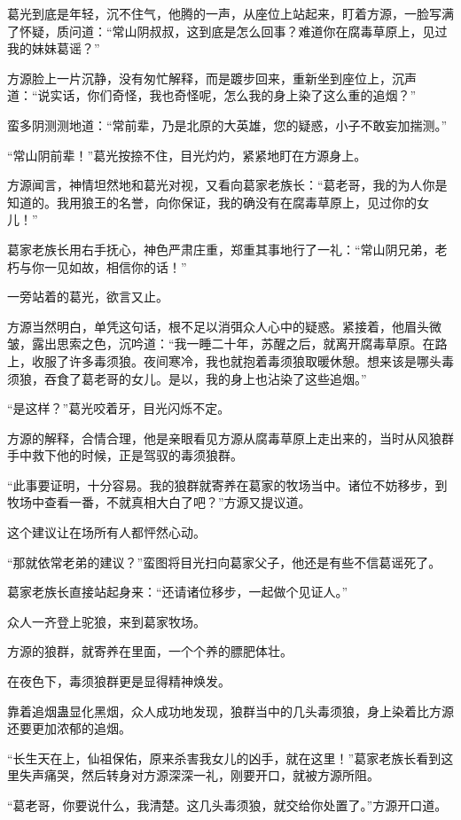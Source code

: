 \begin{this_body}
葛光到底是年轻，沉不住气，他腾的一声，从座位上站起来，盯着方源，一脸写满了怀疑，质问道：“常山阴叔叔，这到底是怎么回事？难道你在腐毒草原上，见过我的妹妹葛谣？”

方源脸上一片沉静，没有匆忙解释，而是踱步回来，重新坐到座位上，沉声道：“说实话，你们奇怪，我也奇怪呢，怎么我的身上染了这么重的追烟？”

蛮多阴测测地道：“常前辈，乃是北原的大英雄，您的疑惑，小子不敢妄加揣测。”

“常山阴前辈！”葛光按捺不住，目光灼灼，紧紧地盯在方源身上。

方源闻言，神情坦然地和葛光对视，又看向葛家老族长：“葛老哥，我的为人你是知道的。我用狼王的名誉，向你保证，我的确没有在腐毒草原上，见过你的女儿！”

葛家老族长用右手抚心，神色严肃庄重，郑重其事地行了一礼：“常山阴兄弟，老朽与你一见如故，相信你的话！”

一旁站着的葛光，欲言又止。

方源当然明白，单凭这句话，根不足以消弭众人心中的疑惑。紧接着，他眉头微皱，露出思索之色，沉吟道：“我一睡二十年，苏醒之后，就离开腐毒草原。在路上，收服了许多毒须狼。夜间寒冷，我也就抱着毒须狼取暖休憩。想来该是哪头毒须狼，吞食了葛老哥的女儿。是以，我的身上也沾染了这些追烟。”

“是这样？”葛光咬着牙，目光闪烁不定。

方源的解释，合情合理，他是亲眼看见方源从腐毒草原上走出来的，当时从风狼群手中救下他的时候，正是驾驭的毒须狼群。

“此事要证明，十分容易。我的狼群就寄养在葛家的牧场当中。诸位不妨移步，到牧场中查看一番，不就真相大白了吧？”方源又提议道。

这个建议让在场所有人都怦然心动。

“那就依常老弟的建议？”蛮图将目光扫向葛家父子，他还是有些不信葛谣死了。

葛家老族长直接站起身来：“还请诸位移步，一起做个见证人。”

众人一齐登上驼狼，来到葛家牧场。

方源的狼群，就寄养在里面，一个个养的膘肥体壮。

在夜色下，毒须狼群更是显得精神焕发。

靠着追烟蛊显化黑烟，众人成功地发现，狼群当中的几头毒须狼，身上染着比方源还要更加浓郁的追烟。

“长生天在上，仙祖保佑，原来杀害我女儿的凶手，就在这里！”葛家老族长看到这里失声痛哭，然后转身对方源深深一礼，刚要开口，就被方源所阻。

“葛老哥，你要说什么，我清楚。这几头毒须狼，就交给你处置了。”方源开口道。


\end{this_body}
